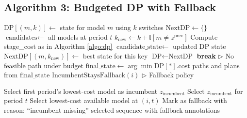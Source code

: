 \subsection{Algorithm 3: Budgeted DP with Fallback}
\label{algo:budgeted-dp-selector}

\begin{algorithm}[H]
\caption{Finite-Horizon DP with Hard Switch Budget and Fallback}
\label{algo:budgeted-dp}
\begin{algorithmic}[1]

    \State $\text{DP}[(m, k)] \leftarrow$ state for model $m$ using $k$ switches
        \State $\text{NextDP} \leftarrow \{\}$
        \State $\text{candidates} \leftarrow$ all models at period $t$
                \State $k_{\text{new}} \leftarrow k + \mathbb{I}[m \neq z^{\text{prev}}]$
                    \State Compute stage\_cost as in Algorithm \ref{algo:dp}
                    \State $\text{candidate\_state} \leftarrow$ updated DP state
                    \State $\text{NextDP}[(m, k_{\text{new}})] \leftarrow$ best state for this key
                \EndIf
            \EndFor
        \EndFor
        \State $\text{DP} \leftarrow \text{NextDP}$
            \State \textbf{break} \quad $\triangleright$ No feasible path under budget
        \EndIf
    \EndFor
        \State $\text{final\_state} \leftarrow \arg\min \text{DP}[*].\text{cost}$
        \State \Return paths and plans from $\text{final\_state}$
    \Else
        \State \Return $\text{IncumbentStaysFallback}(i)$ \quad $\triangleright$ Fallback policy
    \EndIf
\EndFunction

    \State Select first period's lowest-cost model as incumbent $z_{\text{incumbent}}$
            \State Select $z_{\text{incumbent}}$ for period $t$
        \Else
            \State Select lowest-cost available model at $(i, t)$
            \State Mark as fallback with reason: ``incumbent missing''
        \EndIf
    \EndFor
    \State \Return selected sequence with fallback annotations
\EndFunction
\end{algorithmic}
\end{algorithm}

